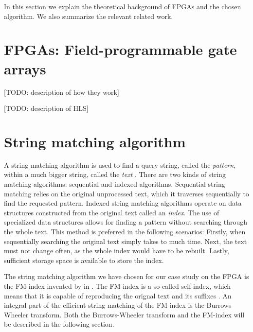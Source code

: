 
In this section we explain the theoretical background of FPGAs and the chosen algorithm.
We also summarize the relevant related work.

\section{FPGAs: Field-programmable gate arrays}

[TODO: description of how they work]

[TODO: description of HLS]

\section{String matching algorithm} \label{section:background_stringmatching}

A string matching algorithm is used to find a query string, called the \textit{pattern}, within a much bigger string, called the \textit{text} \cite{makinen_compressed_2007}.
There are two kinds of string matching algorithms: sequential and indexed algorithms.
Sequential string matching relies on the original unprocessed text, which it traverses sequentially to find the requested pattern.
Indexed string matching algorithms operate on data structures constructed from the original text called an \textit{index}.
The use of specialized data structures allows for finding a pattern without searching through the whole text.
This method is preferred in the following scenarios:
Firstly, when sequentially searching the original text simply takes to much time.
Next, the text must not change often, as the whole index would have to be rebuilt.
Lastly, sufficient storage space is available to store the index.

The string matching algorithm we have chosen for our case study on the FPGA is the FM-index invented by \citeauthor{ferragina_opportunistic_2000} in \citeyear{ferragina_opportunistic_2000}\cite{ferragina_opportunistic_2000}.
The FM-index is a so-called self-index, which means that it is capable of reproducing the orignal text and its suffixes \cite{makinen_compressed_2007}.
An integral part of the efficient string matching of the FM-index is the Burrows-Wheeler transform.
Both the Burrows-Wheeler transform and the FM-index will be described in the following section.

